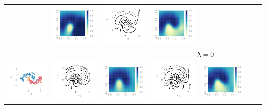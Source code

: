 \documentclass{article}
\theoremstyle{definition}
\begin{document}
\begin{table}
\begin{tabular}{@{}c@{}c@{}c@{}c@{}c@{}c@{}c@{}}
&
\includegraphics[height=0.13\textwidth]{img/moon/moon_rm_30_eubo_prob_0_0.pdf}
&
\includegraphics[trim={7mm 8mm 3mm 3mm}, clip,height=0.13\textwidth]{img/moon/moon_rm_30_elbo_meanf_0_0.pdf}
&
\includegraphics[height=0.13\textwidth]{img/moon/moon_rm_30_elbo_prob_0_0.pdf}
\\
& & & 
\multicolumn{4}{c}{$\lambda = 0$}\\
\midrule
\multirow[t]{4}{*}{
    \includegraphics[trim={0mm 0mm 3mm 3mm}, clip,height=0.13\textwidth]{img/moon/moon_rm_40_data.pdf}
}
&
\multirow[t]{4}{*}{
    \includegraphics[trim={7mm 8mm 3mm 3mm}, clip,height=0.13\textwidth]{img/moon/moon_rm_40_remain_meanf.pdf}
}
&
\multirow[t]{4}{*}{
    \includegraphics[height=0.13\textwidth]{img/moon/moon_rm_40_remain_prob.pdf}
}
&
\includegraphics[trim={7mm 8mm 3mm 3mm}, clip,height=0.13\textwidth]{img/moon/moon_rm_40_eubo_meanf_1e-09.pdf}
&
\includegraphics[height=0.13\textwidth]{img/moon/moon_rm_40_eubo_prob_1e-09.pdf}

\end{tabular}
\end{table}
\end{document}
